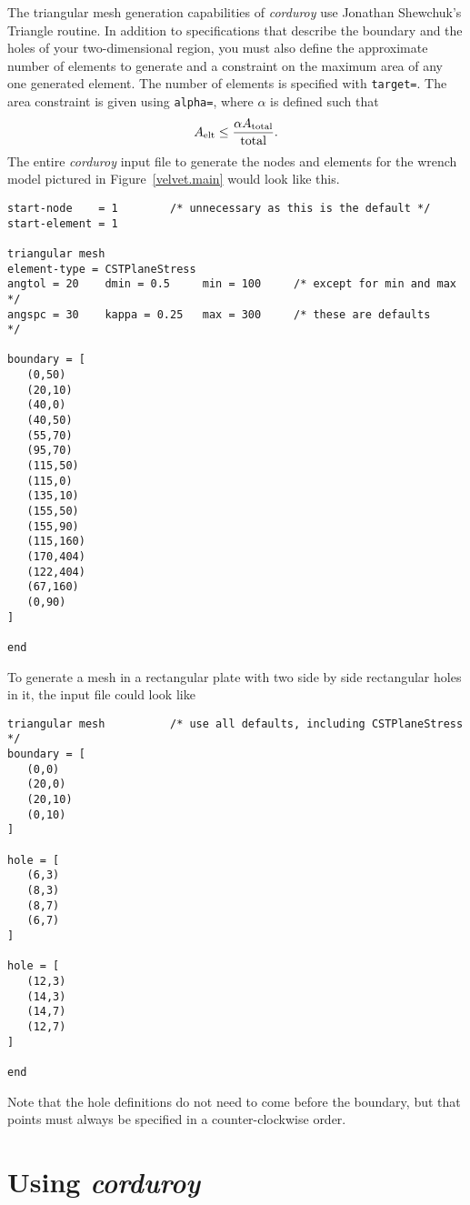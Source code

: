 The triangular mesh generation capabilities of {\em corduroy} use
Jonathan Shewchuk's Triangle routine.  In addition to specifications
that describe the boundary and the holes of your two-dimensional region,
you must also define the approximate number of elements to generate
and a constraint on the maximum area of any one generated element.
The number of elements is specified with {\tt target=}.  The area
constraint is given using {\tt alpha=}, where $\alpha$ is
defined such that 
\begin{equation}
A_{\rm elt} \leq {\alpha A_{\rm total} \over {\rm total}}.
\end{equation}
The entire {\em corduroy} input file to generate the nodes and elements for the
wrench model pictured in Figure~\ref{velvet.main} would look like this.
\begin{screen}
 \begin{verbatim}
start-node    = 1        /* unnecessary as this is the default */
start-element = 1

triangular mesh
element-type = CSTPlaneStress
angtol = 20    dmin = 0.5     min = 100		/* except for min and max */
angspc = 30    kappa = 0.25   max = 300		/* these are defaults     */

boundary = [
   (0,50)
   (20,10)
   (40,0)
   (40,50)
   (55,70)
   (95,70)
   (115,50)
   (115,0)
   (135,10)
   (155,50)
   (155,90)
   (115,160)
   (170,404)
   (122,404)
   (67,160)
   (0,90)
]

end
 \end{verbatim}
\end{screen}

To generate a mesh in a rectangular plate with two side by side rectangular 
holes in it, the input file could look like
\begin{screen}
 \begin{verbatim}
triangular mesh          /* use all defaults, including CSTPlaneStress */
boundary = [
   (0,0)
   (20,0)
   (20,10)
   (0,10)
]

hole = [
   (6,3)
   (8,3)
   (8,7)
   (6,7)
]

hole = [
   (12,3)
   (14,3)
   (14,7)
   (12,7)
]

end
 \end{verbatim}
\end{screen}
Note that the hole definitions do not need to come before the boundary, but
that points must always be specified in a counter-clockwise order.

\section{Using {\em corduroy}}
\label{corduroy.using}

